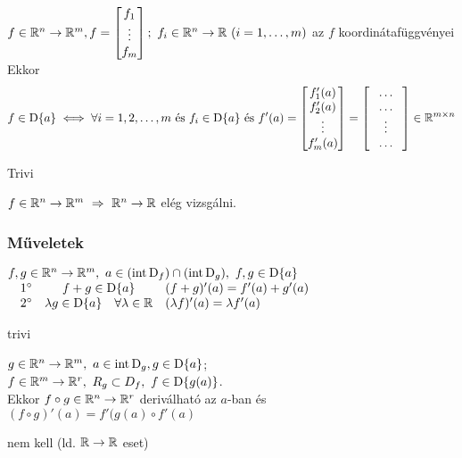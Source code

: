\begin{te}
  $f\in\RnRm, f=\begin{bmatrix}f_1\\\vdots\\f_m\end{bmatrix};\ f_i\in\RnR\ (i=1,\dotsc,m)$ az $f$
  koordinátafüggvényei\\
Ekkor
\[f\in\operatorname{D}\{a\} \iff \forall i = 1,2,\dotsc,m\text{ és } f_i\in\operatorname{D}\{a\} \text{ és } f'(a)= \begin{bmatrix}f_1'(a) \\
  f_2'(a) \\
  \vdots\\ f_m'(a)\end{bmatrix} = \begin{bmatrix}\hspace{0.8em}\dots\hspace{0.8em}\\\dots\\\vdots\\\dots
\end{bmatrix}\in\mathbb{R}^{m\times n}\]
\end{te}
\begin{biz}Trivi
\end{biz}

\begin{megj} $f\in\mathbb{R}^n\to\mathbb{R}^m\ \Rightarrow\ \mathbb{R}^n\to\mathbb{R}$ elég vizsgálni.
\end{megj}
\subsubsection{Műveletek}
\begin{te}$f,g\in\RnRm,\ a\in(\intD_f)\cap(\intD_g),\ f,g\in\der a$\\
  $\begin{array}{@{\quad}rcl}
    1^\circ &  f+g\in\der a & (f+g)'(a) = f'(a) + g'(a)\\
    2^\circ &  \lambda g\in\der a\quad \forall \lambda\in\R & (\lambda f)'(a) = \lambda f'(a)
  \end{array}$
\end{te}
\begin{biz}
  trivi
\end{biz}

\begin{te}
  $g\in\mathbb{R}^n\to\mathbb{R}^m,\ a\in\operatorname{int\,D}_g, g\in\operatorname{D}\{a\}$;\\ $f\in\mathbb{R}^m\to\mathbb{R}^r,\ R_g\subset D_f,\ f\in \operatorname{D}\{g(a)\}$.\\
  Ekkor $f\circ g\in\mathbb{R}^n\to\mathbb{R}^r$ deriválható az $a$-ban és $(f\circ g)'(a) = f'(g(a) \circ f'(a)$
\end{te}
\begin{biz} nem kell (ld. $\mathbb{R}\to\mathbb{R}$ eset)
\end{biz}

